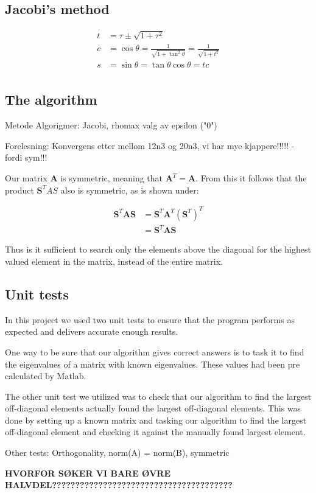 \subsection{Jacobi's method}

\begin{align*}
t &= \tau \pm \sqrt{1+\tau^2}\\ 
c &= \cos \theta = \frac{1}{\sqrt{1+\tan^2\theta}} = \frac{1}{\sqrt{1+t^2}}\\
s &= \sin \theta = \tan \theta \cos \theta = t c\\
\end{align*}

\subsection{The algorithm}



	Metode
Algorigmer: Jacobi, rhomax
valg av epsilon ("0")

Forelesning: Konvergens etter mellom 12n3 og 20n3, vi har mye kjappere!!!!! - fordi sym!!!


Our matrix \textbf{A} is symmetric, meaning that $ \textbf{A}^T = \textbf{A} $. From this it follows that the product $ \textbf{S}^TAS $ also is symmetric, as is shown under:

\begin{align}
\textbf{S}^T\textbf{AS} &= \textbf{S}^T\textbf{A}^T(\textbf{S}^T)^T\\
&= \textbf{S}^T\textbf{AS} 
\end{align}

Thus is it sufficient to search only the elements above the diagonal for the highest valued element in the matrix, instead of the entire matrix. 



\subsection{Unit tests}

In this project we used two unit tests to ensure that the program performs as expected and delivers accurate enough results. 

One way to be sure that our algorithm gives correct answers is to task it to find the eigenvalues of a matrix with known eigenvalues. These values had been pre calculated by Matlab. 

The other unit test we utilized was to check that our algorithm to find the largest off-diagonal elements actually found the largest off-diagonal elements. This was done by setting up a known matrix and tasking our algorithm to find the largest off-diagonal element and checking it against the manually found largest element. 




Other tests: Orthogonality, norm(A) = norm(B), symmetric


\textbf{HVORFOR SØKER VI BARE ØVRE HALVDEL???????????????????????????????????????}